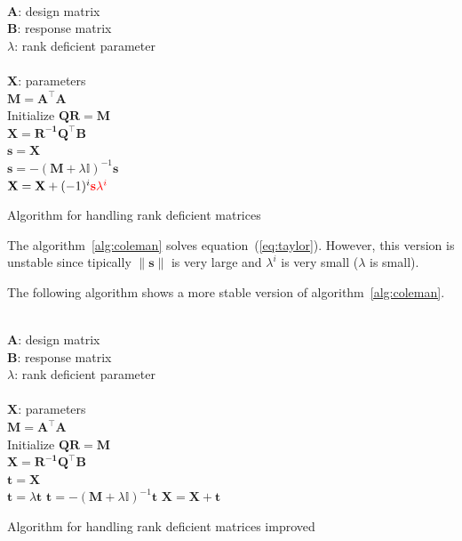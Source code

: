 \begin{algorithm}[H]
\begin{algorithmic}[1]
\REQUIRE $\,$ \\
$\mathbf{A}$: design matrix \\
$\mathbf{B}$: response matrix \\
$\lambda$: rank deficient parameter \\
\ENSURE  $\,$ \\
$\mathbf{X}$: parameters \\
\STATE $\mathbf{M}=\mathbf{A^\top A}$ \\
\STATE Initialize $\mathbf{Q R}=\mathbf{M}$ \\
\STATE $\mathbf{X} = \mathbf{R^{-1}Q^\top B}$ \\
\STATE $\mathbf{s} = \mathbf{X}$ \\
	\STATE $\mathbf{s} =
        -(\mathbf{M}+\lambda\mathbb{I})^{-1}\mathbf{s}$\\
	\STATE $\mathbf{X}=\mathbf{X} + (-1)^i {\color{red}\mathbf{s}
        \lambda^i}$
\ENDFOR
\end{algorithmic}
\caption{Algorithm for handling rank deficient matrices}
\label{alg:coleman}
\end{algorithm}

The algorithm~\ref{alg:coleman} solves equation~(\ref{eq:taylor}). However, this
version is unstable since tipically $\|\mathbf{s}\|$ is very large and
$\lambda^i$ is very small ($\lambda$ is small).

The following algorithm shows a more stable version of
algorithm~\ref{alg:coleman}.


\begin{algorithm}[H]
\begin{algorithmic}[1]
\REQUIRE $\,$ \\
$\mathbf{A}$: design matrix \\
$\mathbf{B}$: response matrix \\
$\lambda$: rank deficient parameter \\
\ENSURE  $\,$ \\
$\mathbf{X}$: parameters \\
\STATE $\mathbf{M}=\mathbf{A^\top A}$ \\
\STATE Initialize $\mathbf{Q R}=\mathbf{M}$ \\
\STATE $\mathbf{X} = \mathbf{R^{-1}Q^\top B}$ \\
\STATE $\mathbf{t} = \mathbf{X}$ \\
        \STATE $\mathbf{t} =\lambda \mathbf{t}$  
        \STATE $\mathbf{t} =  -(\mathbf{M}+\lambda\mathbb{I})^{-1}\mathbf{t}$
	\STATE $\mathbf{X}=\mathbf{X} + \mathbf{t}$
\ENDFOR
\end{algorithmic}
\caption{Algorithm for handling rank deficient matrices improved}
\label{alg:colemanimproved}
\end{algorithm}


